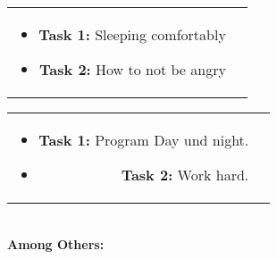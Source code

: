 \documentclass[10pt,a4paper,ragged2e,withhyper]{altacv}
\begin{document}
\begin{tabular}{@{\,}r <{\hskip 2pt} !{\foo} >{\raggedright\arraybackslash}p{14.3cm}}
\begin{itemize}
\item \textbf{Task 1:} Sleeping comfortably
\item \textbf{Task 2:} How to not be angry
\end{itemize} 

\end{tabular}


\begin{tabular}{@{\,}r <{\hskip 2pt} !{\foo} >{\raggedright\arraybackslash}p{14.3cm}}
\begin{itemize}
\item \textbf{Task 1:} Program Day und night.  
\item \textbf{Task 2:} Work hard.
\end{itemize} 
\end{tabular}

\begin{minipage}[t]{0.45\textwidth}

\divider\smallskip \\
\textbf{Among Others:} \\

\end{minipage}\hfill
\begin{minipage}[t]{0.45\textwidth}



\divider 


\end{minipage}
\end{document}
